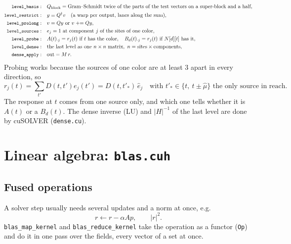 \documentclass[11pt,a4paper]{article}
\numberwithin{equation}{section}
\newcommand{\code}[1]{\texttt{\small #1}}
\newcommand{\dg}{^{\dagger}}
\begin{document}
\begin{align}
\code{level\_basis}:&\quad Q_{\text{block}} = \text{Gram--Schmidt twice of the parts of the test vectors on a super-block and a half},\\
\code{level\_restrict}:&\quad y = Q\dg v\quad(\text{a warp per output, lanes along the sum}),\\
\code{level\_prolong}:&\quad v = Qy\ \text{or}\ v\mathrel{+}=Qy,\\
\code{level\_sources}:&\quad e_j = 1\ \text{at component }j\text{ of the sites of one color},\\
\code{level\_probe}:&\quad A(t)_{\cdot j} = r_j(t)\ \text{if }t\text{ has the color},\quad B_d(t)_{\cdot j} = r_j(t)\ \text{if }N[d][t]\text{ has it},\\
\code{level\_dense}:&\quad \text{the last level as one }n\times n\text{ matrix},\ n=\text{sites}\times\text{components},\\
\code{dense\_apply}:&\quad \text{out} = M\,r .
\end{align}
Probing works because the sources of one color are at least 3 apart in every direction, so
\begin{equation}
r_j(t) = \sum_{t'}D(t,t')e_j(t') = D(t,t'_*)\,\hat e_j\quad\text{with }t'_*\in\{t,\ t\pm\hat\mu\}\text{ the only source in reach}.
\end{equation}
The response at $t$ comes from one source only, and which one tells whether it is $A(t)$ or a
$B_d(t)$. The dense inverse (LU) and $|H|^{-1}$ of the last level are done by cuSOLVER
(\code{dense.cu}).

\section{Linear algebra: \code{blas.cuh}}

\subsection{Fused operations}

A solver step usually needs several updates and a norm at once, e.g.\
\begin{equation}
r \leftarrow r - \alpha Ap,\qquad |r|^2 .
\end{equation}
\code{blas\_map\_kernel} and \code{blas\_reduce\_kernel} take the operation as a functor
(\code{Op}) and do it in one pass over the fields, every vector of a set at once.
\end{document}

